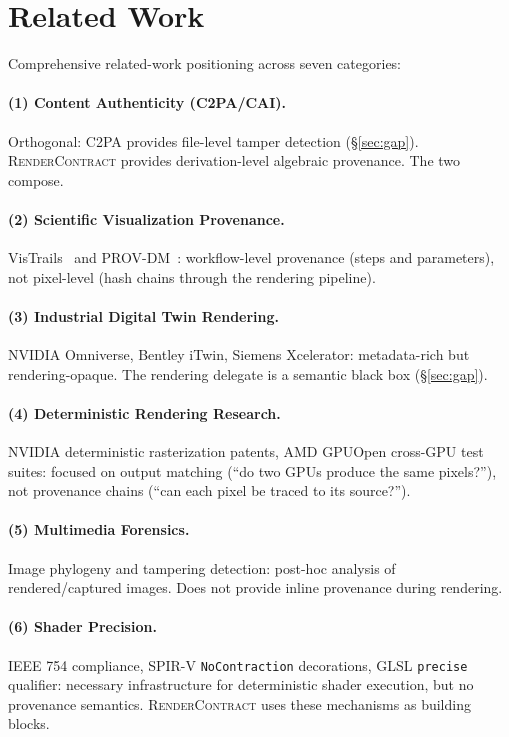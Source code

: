 \documentclass[sigconf,nonacm]{acmart}
\newcommand{\rendercontract}{\textsc{RenderContract}}
\begin{document}
\section{Related Work}
\label{sec:related-work}

Comprehensive related-work positioning across seven categories:

\paragraph{(1) Content Authenticity (C2PA/CAI).}
Orthogonal: C2PA provides file-level tamper detection
(\S\ref{sec:gap}). \rendercontract{} provides derivation-level
algebraic provenance. The two compose.

\paragraph{(2) Scientific Visualization Provenance.}
VisTrails~\cite{vistrails-aosa} and
PROV-DM~\cite{prov-dm-w3c}: workflow-level provenance
(steps and parameters), not pixel-level (hash chains
through the rendering pipeline).

\paragraph{(3) Industrial Digital Twin Rendering.}
NVIDIA Omniverse, Bentley iTwin, Siemens Xcelerator:
metadata-rich but rendering-opaque. The rendering delegate
is a semantic black box (\S\ref{sec:gap}).

\paragraph{(4) Deterministic Rendering Research.}
NVIDIA deterministic rasterization patents, AMD GPUOpen
cross-GPU test suites: focused on output matching (``do two
GPUs produce the same pixels?''), not provenance chains
(``can each pixel be traced to its source?'').

\paragraph{(5) Multimedia Forensics.}
Image phylogeny and tampering detection: post-hoc analysis
of rendered/captured images. Does not provide inline
provenance during rendering.

\paragraph{(6) Shader Precision.}
IEEE 754 compliance, SPIR-V \texttt{NoContraction}
decorations, GLSL \texttt{precise} qualifier: necessary
infrastructure for deterministic shader execution, but
no provenance semantics. \rendercontract{} uses these
mechanisms as building blocks.
\end{document}
